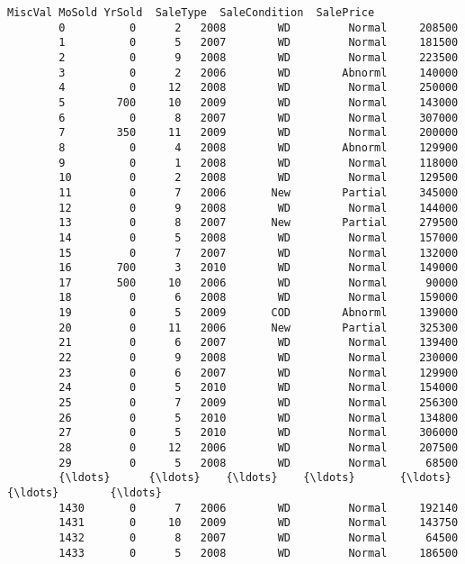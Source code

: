 \documentclass[11pt]{article}
\begin{document}
\begin{Verbatim}[commandchars=\\\{\}]
             MiscVal MoSold YrSold  SaleType  SaleCondition  SalePrice  
        0          0      2   2008        WD         Normal     208500  
        1          0      5   2007        WD         Normal     181500  
        2          0      9   2008        WD         Normal     223500  
        3          0      2   2006        WD        Abnorml     140000  
        4          0     12   2008        WD         Normal     250000  
        5        700     10   2009        WD         Normal     143000  
        6          0      8   2007        WD         Normal     307000  
        7        350     11   2009        WD         Normal     200000  
        8          0      4   2008        WD        Abnorml     129900  
        9          0      1   2008        WD         Normal     118000  
        10         0      2   2008        WD         Normal     129500  
        11         0      7   2006       New        Partial     345000  
        12         0      9   2008        WD         Normal     144000  
        13         0      8   2007       New        Partial     279500  
        14         0      5   2008        WD         Normal     157000  
        15         0      7   2007        WD         Normal     132000  
        16       700      3   2010        WD         Normal     149000  
        17       500     10   2006        WD         Normal      90000  
        18         0      6   2008        WD         Normal     159000  
        19         0      5   2009       COD        Abnorml     139000  
        20         0     11   2006       New        Partial     325300  
        21         0      6   2007        WD         Normal     139400  
        22         0      9   2008        WD         Normal     230000  
        23         0      6   2007        WD         Normal     129900  
        24         0      5   2010        WD         Normal     154000  
        25         0      7   2009        WD         Normal     256300  
        26         0      5   2010        WD         Normal     134800  
        27         0      5   2010        WD         Normal     306000  
        28         0     12   2006        WD         Normal     207500  
        29         0      5   2008        WD         Normal      68500  
        {\ldots}      {\ldots}    {\ldots}    {\ldots}       {\ldots}            {\ldots}        {\ldots}  
        1430       0      7   2006        WD         Normal     192140  
        1431       0     10   2009        WD         Normal     143750  
        1432       0      8   2007        WD         Normal      64500  
        1433       0      5   2008        WD         Normal     186500  

\end{Verbatim}
\end{document}
